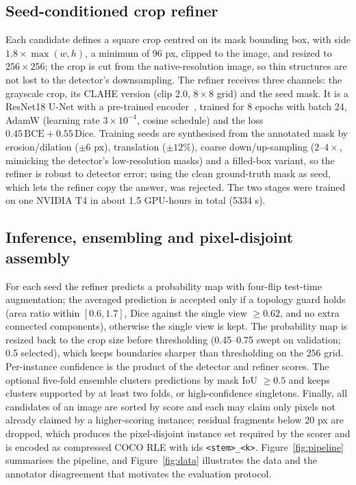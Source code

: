 \documentclass[sigconf]{acmart}
\begin{document}
\subsection{Seed-conditioned crop refiner}
Each candidate defines a square crop centred on its mask bounding box, with side $1.8\times\max(w,h)$, a minimum of 96 px, clipped to the image, and resized to $256\times256$; the crop is cut from the native-resolution image, so thin structures are not lost to the detector's downsampling.
The refiner receives three channels: the grayscale crop, its CLAHE version (clip 2.0, $8\times8$ grid) and the seed mask.
It is a ResNet18 U-Net with a pre-trained encoder~\cite{ronneberger2015}, trained for 8 epochs with batch 24, AdamW (learning rate $3\times10^{-4}$, cosine schedule) and the loss $0.45\,\mathrm{BCE}+0.55\,\mathrm{Dice}$.
Training seeds are synthesised from the annotated mask by erosion/dilation ($\pm6$ px), translation ($\pm12\%$), coarse down/up-sampling ($2$--$4\times$, mimicking the detector's low-resolution masks) and a filled-box variant, so the refiner is robust to detector error; using the clean ground-truth mask as seed, which lets the refiner copy the answer, was rejected.
The two stages were trained on one NVIDIA T4 in about 1.5 GPU-hours in total (5334 s).

\subsection{Inference, ensembling and pixel-disjoint assembly}
For each seed the refiner predicts a probability map with four-flip test-time augmentation; the averaged prediction is accepted only if a topology guard holds (area ratio within $[0.6,1.7]$, Dice against the single view $\ge 0.62$, and no extra connected components), otherwise the single view is kept.
The probability map is resized back to the crop size before thresholding (0.45--0.75 swept on validation; 0.5 selected), which keeps boundaries sharper than thresholding on the $256$ grid.
Per-instance confidence is the product of the detector and refiner scores.
The optional five-fold ensemble clusters predictions by mask IoU $\ge0.5$ and keeps clusters supported by at least two folds, or high-confidence singletons.
Finally, all candidates of an image are sorted by score and each may claim only pixels not already claimed by a higher-scoring instance; residual fragments below 20 px are dropped, which produces the pixel-disjoint instance set required by the scorer and is encoded as compressed COCO RLE with ids \texttt{<stem>\_<k>}.
Figure~\ref{fig:pipeline} summarises the pipeline, and Figure~\ref{fig:data} illustrates the data and the annotator disagreement that motivates the evaluation protocol.
\end{document}
